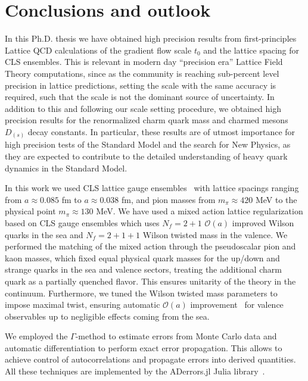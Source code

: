 \chapter*{Conclusions and outlook}
\label{ch_conclu}

In this Ph.D. thesis we have obtained high precision results from first-principles Lattice QCD calculations of the gradient flow scale $t_0$ and the lattice spacing for CLS ensembles. This is relevant in modern day ``precision era'' Lattice Field Theory computations, since as the community is reaching sub-percent level precision in lattice predictions, setting the scale with the same accuracy is required, such that the scale is not the dominant source of uncertainty. In addition to this and following our scale setting procedure, we obtained high precision results for the renormalized charm quark mass and charmed mesons $D_{(s)}$ decay constants. In particular, these results are of utmost importance for high precision tests of the Standard Model and the search for New Physics, as they are expected to contribute to the detailed understanding of heavy quark dynamics in the Standard Model.

In this work we used CLS lattice gauge ensembles~\citep{Bruno:2014jqa,Mohler:2017wnb} with lattice spacings ranging from $a\approx0.085$ fm to $a\approx0.038$ fm, and pion masses from $m_{\pi}\approx420$ MeV to the physical point $m_{\pi}\approx130$ MeV. We have used a mixed action lattice regularization based on CLS gauge ensembles which uses $N_f=2+1$ $\mathcal{O}(a)$ improved Wilson quarks in the sea and $N_f=2+1+1$ Wilson twisted mass in the valence. We performed the matching of the mixed action through the pseudoscalar pion and kaon masses, which fixed equal physical quark masses for the up/down and strange quarks in the sea and valence sectors, treating the additional charm quark as a partially quenched flavor. This ensures unitarity of the theory in the continuum. Furthermore, we tuned the Wilson twisted mass parameters to impose maximal twist, ensuring automatic $\mathcal{O}(a)$ improvement~\citep{Frezzotti:2003ni,Shindler:2007vp} for valence observables up to negligible effects coming from the sea.

We employed the $\Gamma$-method to estimate errors from Monte Carlo data and automatic differentiation to perform exact error propagation. This allows to achieve control of autocorrelations and propagate errors into derived quantities. All these techniques are implemented by the ADerrors.jl Julia library~\citep{Ramos:2018vgu,Ramos:2020scv}. 

